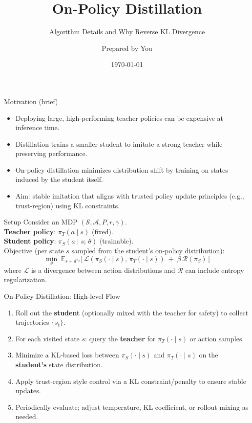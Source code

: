\documentclass[10pt,aspectratio=169]{beamer}
\title{On-Policy Distillation}
\subtitle{Algorithm Details and Why Reverse KL Divergence}
\author{Prepared by You}
\institute{Study Notes}
\date{\today}
\begin{document}
\begin{frame}
  \titlepage
\end{frame}

\begin{frame}{Motivation (brief)}
  \begin{itemize}
    \item Deploying large, high-performing teacher policies can be expensive at inference time.
    \item Distillation trains a smaller student to imitate a strong teacher while preserving performance.
    \item On-policy distillation minimizes distribution shift by training on states induced by the student itself.
    \item Aim: stable imitation that aligns with trusted policy update principles (e.g., trust-region) using KL constraints.
  \end{itemize}
\end{frame}

\begin{frame}{Setup}
  Consider an MDP $(\mathcal{S}, \mathcal{A}, P, r, \gamma)$.\\[2mm]
  \textbf{Teacher policy}: $\pi_T(a\mid s)$ (fixed).\\
  \textbf{Student policy}: $\pi_S(a\mid s;\,\theta)$ (trainable).\\[2mm]
  Objective (per state $s$ sampled from the student’s on-policy distribution):
  \[
    \min_{\theta} \; \mathbb{E}_{s \sim d^{\pi_S}}\big[\, \mathcal{L}(\pi_S(\cdot\mid s),\,\pi_T(\cdot\mid s)) 
    \; + \; \beta\, \mathcal{R}(\pi_S) \,\big]
  \]
  where $\mathcal{L}$ is a divergence between action distributions and $\mathcal{R}$ can include entropy regularization.
\end{frame}

\begin{frame}{On-Policy Distillation: High-level Flow}
  \begin{enumerate}
    \item Roll out the \textbf{student} (optionally mixed with the teacher for safety) to collect trajectories $\{s_t\}$.
    \item For each visited state $s$: query the \textbf{teacher} for $\pi_T(\cdot\mid s)$ or action samples.
    \item Minimize a KL-based loss between $\pi_S(\cdot\mid s)$ and $\pi_T(\cdot\mid s)$ on the \textbf{student’s} state distribution.
    \item Apply trust-region style control via a KL constraint/penalty to ensure stable updates.
    \item Periodically evaluate; adjust temperature, KL coefficient, or rollout mixing as needed.
  \end{enumerate}
\end{frame}
\end{document}
